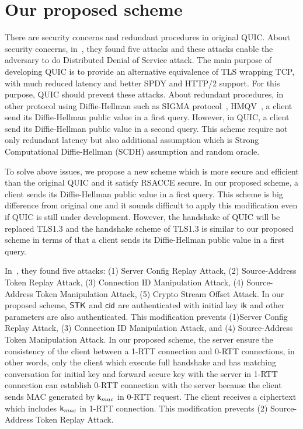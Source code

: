 \section{Our proposed scheme} \label{sec:proposed_scheme}

There are security concerns and redundant procedures in original
QUIC.
About security concerns, in~\cite{LJBN15:QUIC}, they found five
attacks and these attacks enable the adversary to do Distributed
Denial of Service attack.
The main purpose of developing QUIC is to provide an
alternative equivalence of TLS wrapping TCP, with much
reduced latency and better SPDY and HTTP/2 support.
For this purpose, QUIC should prevent these attacks.
About redundant procedures, in other protocol using Diffie-Hellman
such as SIGMA protocol~\cite{Kra03:SIGMA}, HMQV~\cite{Kra05:HQMV},
a client send its Diffie-Hellman public value in a first query. However,
in QUIC, a client send its Diffie-Hellman public value in a second query.
This scheme require not only redundant latency but also additional assumption
 which is Strong Computational Diffie-Hellman (SCDH) assumption and random oracle.

To solve above issues, we propose a new scheme which is more secure and efficient
than the original QUIC and it satisfy RSACCE secure.
In our proposed scheme, a client sends its Diffie-Hellman public value in
a first query.
This scheme is big difference from original one and it sounds difficult to apply
this modification even if QUIC is still under development.
However, the handshake of QUIC will be replaced TLS1.3 and the handshake scheme of
TLS1.3 is similar to our proposed scheme in terms of that a client sends its
Diffie-Hellman public value in a first query.

In~\cite{LJBN15:QUIC}, they found five attacks:
(1) Server Config Replay Attack,
(2) Source-Address Token Replay Attack,
(3) Connection ID Manipulation Attack,
(4) Source-Address Token Manipulation Attack,
(5) Crypto Stream Offset Attack.
In our proposed scheme, $\mathsf{STK}$ and $\mathsf{cid}$ are authenticated with initial key
$\mathsf{ik}$ and other parameters are also authenticated.
This modification prevents (1)Server Config Replay Attack,
(3) Connection ID Manipulation Attack, and
(4) Source-Address Token Manipulation Attack.
In our proposed scheme, the server ensure the consistency of the client between
a 1-RTT connection and 0-RTT connections, in other words, only the client which
execute full handshake and has matching conversation for initial key and forward
secure key with the server in 1-RTT connection can establish 0-RTT connection with
the server because the client sends MAC generated by $\mathsf{k}_{mac}$ in 0-RTT request.
The client receives a ciphertext which includes $\mathsf{k}_{mac}$ in 1-RTT connection.
This modification prevents (2) Source-Address Token Replay Attack.

